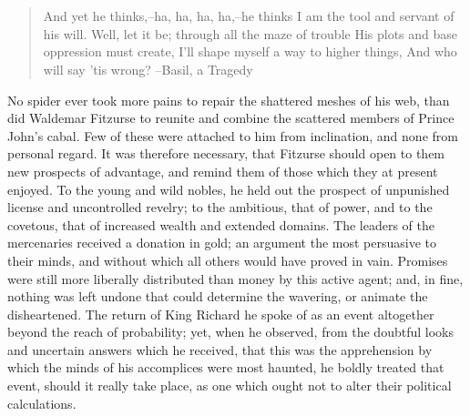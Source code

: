 \chapter{}

\begin{quote}
And yet he thinks,--ha, ha, ha, ha,--he thinks
I am the tool and servant of his will.
Well, let it be; through all the maze of trouble
His plots and base oppression must create,
I'll shape myself a way to higher things,
And who will say 'tis wrong?
--Basil, a Tragedy
\end{quote}

No spider ever took more pains to repair the shattered meshes of his
web, than did Waldemar Fitzurse to reunite and combine the scattered
members of Prince John's cabal. Few of these were attached to him from
inclination, and none from personal regard. It was therefore necessary,
that Fitzurse should open to them new prospects of advantage, and remind
them of those which they at present enjoyed. To the young and wild
nobles, he held out the prospect of unpunished license and uncontrolled
revelry; to the ambitious, that of power, and to the covetous, that of
increased wealth and extended domains. The leaders of the mercenaries
received a donation in gold; an argument the most persuasive to their
minds, and without which all others would have proved in vain. Promises
were still more liberally distributed than money by this active agent;
and, in fine, nothing was left undone that could determine the wavering,
or animate the disheartened. The return of King Richard he spoke of as
an event altogether beyond the reach of probability; yet, when he
observed, from the doubtful looks and uncertain answers which he
received, that this was the apprehension by which the minds of his
accomplices were most haunted, he boldly treated that event, should it
really take place, as one which ought not to alter their political
calculations.

